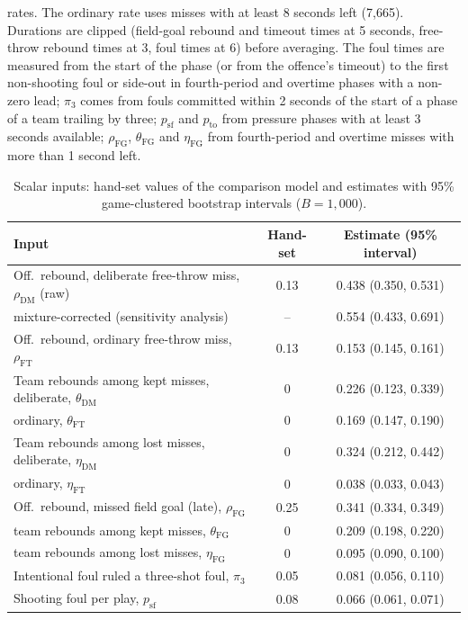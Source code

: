 \documentclass[article]{jdssv}
\begin{document}
rates. The ordinary rate uses misses with at least 8
seconds left (7{,}665). Durations are clipped (field-goal rebound and timeout times at 5
seconds, free-throw rebound times at 3, foul times at 6) before averaging. The foul times are measured from the start
of the phase (or from the offence's timeout) to the first non-shooting foul or side-out in fourth-period and overtime
phases with a non-zero lead; $\pi_3$ comes from fouls committed within 2 seconds of the start of a phase of a team
trailing by three; $p_{\mathrm{sf}}$ and $p_{\mathrm{to}}$ from pressure phases with at least 3 seconds available;
$\rho_{\mathrm{FG}}$, $\theta_{\mathrm{FG}}$ and $\eta_{\mathrm{FG}}$ from fourth-period and overtime misses with more than
1 second left.

\begin{table}[t]
\centering
\caption{Scalar inputs: hand-set values of the comparison model and estimates with 95\% game-clustered
bootstrap intervals ($B=1{,}000$).}
\label{tab:inputs}
\small
\begin{tabular}{lcc}
\toprule
Input & Hand-set & Estimate (95\% interval)\\
\midrule
Off.\ rebound, deliberate free-throw miss, $\rho_{\mathrm{DM}}$ (raw) & 0.13 & 0.438 (0.350, 0.531)\\
\quad mixture-corrected (sensitivity analysis) & -- & 0.554 (0.433, 0.691)\\
Off.\ rebound, ordinary free-throw miss, $\rho_{\mathrm{FT}}$ & 0.13 & 0.153 (0.145, 0.161)\\
Team rebounds among kept misses, deliberate, $\theta_{\mathrm{DM}}$ & 0 & 0.226 (0.123, 0.339)\\
\quad ordinary, $\theta_{\mathrm{FT}}$ & 0 & 0.169 (0.147, 0.190)\\
Team rebounds among lost misses, deliberate, $\eta_{\mathrm{DM}}$ & 0 & 0.324 (0.212, 0.442)\\
\quad ordinary, $\eta_{\mathrm{FT}}$ & 0 & 0.038 (0.033, 0.043)\\
Off.\ rebound, missed field goal (late), $\rho_{\mathrm{FG}}$ & 0.25 & 0.341 (0.334, 0.349)\\
\quad team rebounds among kept misses, $\theta_{\mathrm{FG}}$ & 0 & 0.209 (0.198, 0.220)\\
\quad team rebounds among lost misses, $\eta_{\mathrm{FG}}$ & 0 & 0.095 (0.090, 0.100)\\
Intentional foul ruled a three-shot foul, $\pi_3$ & 0.05 & 0.081 (0.056, 0.110)\\
Shooting foul per play, $p_{\mathrm{sf}}$ & 0.08 & 0.066 (0.061, 0.071)\\

\end{tabular}
\end{table}
\end{document}
